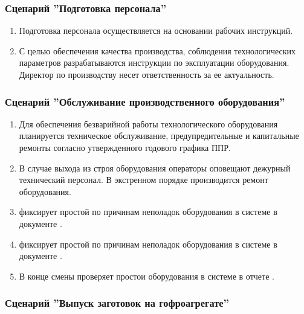 \subsubsection{Сценарий ''Подготовка персонала''}
\label{bp:production_7}

\begin{enumerate}
\item Подготовка персонала осуществляется на основании рабочих инструкций.
\item 	С целью обеспечения качества производства, соблюдения технологических параметров разрабатываются инструкции по эксплуатации оборудования. Директор по производству несет ответственность за ее актуальность.


\end{enumerate}

\subsubsection{Сценарий ''Обслуживание производственного оборудования''}
\label{bp:production_8}

\begin{enumerate}
\item 	Для обеспечения безварийной работы технологического оборудования планируется техническое обслуживание, предупредительные и капитальные ремонты согласно утвержденного годового графика ППР.
\item 	В случае выхода из строя оборудования операторы оповещают дежурный технический персонал. В экстренном порядке производится ремонт оборудования. 
\item 	\gaoperator фиксирует простой по причинам неполадок оборудования в системе \gofro в документе .
\item 	\operator фиксирует простой по причинам неполадок оборудования в системе \gofro в документе .
\item 	В конце смены \master проверяет простои оборудования в системе \gofro в отчете .


\end{enumerate}





\subsubsection{Сценарий ''Выпуск заготовок на гофроагрегате''}
\label{bp:production_9}

